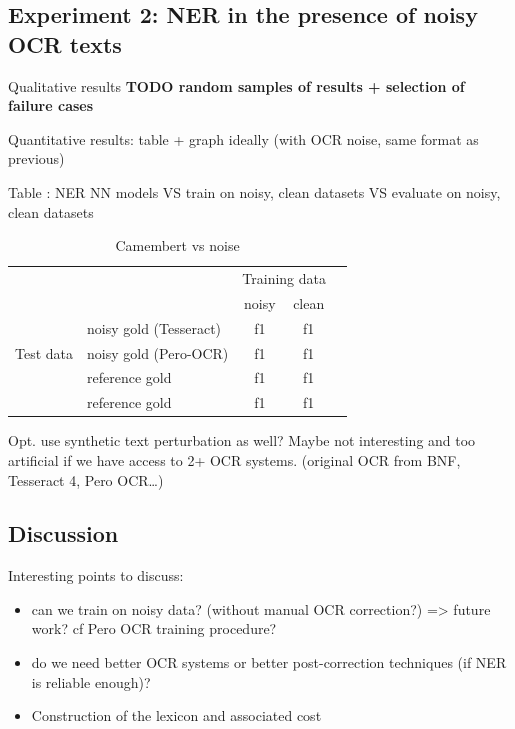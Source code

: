 \subsection{Experiment 2: NER in the presence of noisy OCR texts}

Qualitative results
\textbf{TODO random samples of results + selection of failure cases}

Quantitative results: table + graph ideally (with OCR noise, same format as previous)

Table : NER NN models VS train on {noisy, clean} datasets VS evaluate on {noisy, clean} datasets


\begin{table}[h!]
\caption{Camembert vs noise}
\centering
\begin{tabular}{ll|cc|c}
 & & \multicolumn{2}{c|}{Training data} & \\
 & & noisy & clean &   \\ 
\cline{1-4}
\multirow{3}{*}{Test data}& noisy gold (Tesseract) & f1 & f1 & \\
                            & noisy gold (Pero-OCR) & f1 & f1 & \\ 
                            & reference gold & f1 & f1 & \\ 
                            & reference gold & f1 & f1 & \\
\cline{1-4}
\end{tabular}
\end{table}



Opt. use synthetic text perturbation as well? Maybe not interesting and too artificial if we have access to 2+ OCR systems.
(original OCR from BNF, Tesseract 4, Pero OCR…)


\subsection{Discussion}
Interesting points to discuss:
\begin{itemize}
    \item can we train on noisy data? (without manual OCR correction?) => future work? cf Pero OCR training procedure?
    \item do we need better OCR systems or better post-correction techniques (if NER is reliable enough)?
    \item Construction of the lexicon and associated cost
\end{itemize}
